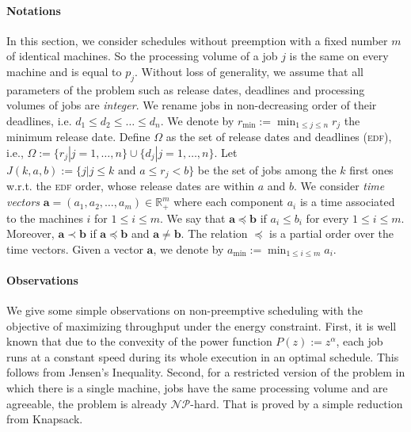 \documentclass[11pt,a4paper]{article}
\newcommand{\vecteur}[1]{\ensuremath{\mathbf{#1}}}
\begin{document}
\paragraph{Notations} In this section, we consider schedules without preemption with 
a fixed number $m$ of identical machines. So the processing volume of a job $j$
is the same on every machine and is equal to $p_{j}$. 
Without loss of generality, we assume that all parameters of the problem such as 
release dates, deadlines and processing volumes of jobs are \emph{integer}.
We rename jobs in non-decreasing order of their deadlines, i.e. 
$d_1\le d_2 \le \ldots \le d_n$.
We denote by $r_{\min}:=\min_{1\le j \le n}r_j$ 
the minimum release date.
Define $\Omega$ as the set of release dates and deadlines (\textsc{edf}), 
i.e., $\Omega := \{r_j |  j=1,\ldots, n\} \cup \{d_j | j=1,\ldots, n\}$.
Let $J(k,a,b) :=\{ j | j\leq k \mbox{ and } a \le r_j < b \}$ 
be the set of jobs among the $k$ first ones w.r.t. the \textsc{edf} order,
whose release dates are within $a$ and $b$.
We consider \emph{time vectors} $\vecteur{a}=(a_1,a_2,\ldots, a_m) \in \mathbb{R}_{+}^{m}$ 
where each component $a_{i}$ is a time associated to the machines $i$ for $1 \leq i \leq m$.
We say that $\vecteur{a} \preceq \vecteur{b}$ if $a_{i} \leq b_{i}$ for every $1 \leq i \leq m$.
Moreover, $\vecteur{a}\prec \vecteur{b}$ if $\vecteur{a} \preceq \vecteur{b}$ and 
$\vecteur{a} \neq \vecteur{b}$. The relation $\preceq$ is a partial order over 
the time vectors. Given a vector $\vecteur{a}$, we denote by 
$a_{\min}:=\min_{1\le i \le m}a_i$.

\paragraph{Observations} We give some simple observations on non-preemptive scheduling with the objective 
of maximizing
throughput under the energy constraint. First, it is well known that
due to the convexity of the power function $P(z) := z^{\alpha}$, 
each job runs at a constant speed during its whole
execution in an optimal schedule. This follows from Jensen's Inequality.
Second, for a restricted version of the problem in which there is a single machine, jobs have the same 
processing volume and are agreeable, the problem is already $\mathcal{NP}$-hard.
That is proved by a simple reduction from {\sc Knapsack}.
\end{document}
